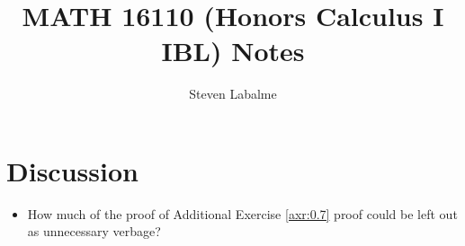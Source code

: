 \documentclass[titlepage]{report}
\title{MATH 16110 (Honors Calculus I IBL) Notes}
\author{Steven Labalme}
\begin{document}
\maketitle



\tableofcontents
\listoffigures
\newpage



\pagestyle{main}




\setcounter{secnumdepth}{3}



\section{Discussion}
\begin{itemize}
    \item {}How much of the proof of Additional Exercise \ref{axr:0.7} proof could be left out as unnecessary verbage?
\end{itemize}




\end{document}
